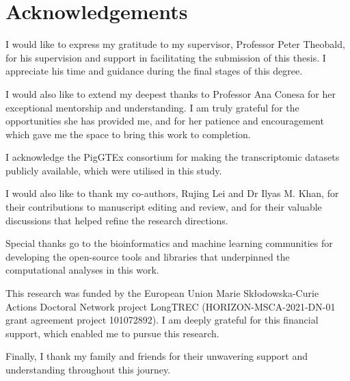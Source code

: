 \markboth{}{}
\chapter*{Acknowledgements}
\label{chapter:acknowledgments}

I would like to express my gratitude to my supervisor, Professor Peter Theobald, for his supervision and support in facilitating the submission of this thesis. I appreciate his time and guidance during the final stages of this degree.

I would also like to extend my deepest thanks to Professor Ana Conesa for her exceptional mentorship and understanding. I am truly grateful for the opportunities she has provided me, and for her patience and encouragement which gave me the space to bring this work to completion.

I acknowledge the PigGTEx consortium for making the transcriptomic datasets publicly available, which were utilised in this study.

I would also like to thank my co-authors, Rujing Lei and Dr Ilyas M. Khan, for their contributions to manuscript editing and review, and for their valuable discussions that helped refine the research directions.

Special thanks go to the bioinformatics and machine learning communities for developing the open-source tools and libraries that underpinned the computational analyses in this work.

This research was funded by the European Union Marie Sk\l{}odowska-Curie Actions Doctoral Network project LongTREC (HORIZON-MSCA-2021-DN-01 grant agreement project 101072892). I am deeply grateful for this financial support, which enabled me to pursue this research.

Finally, I thank my family and friends for their unwavering support and understanding throughout this journey.
